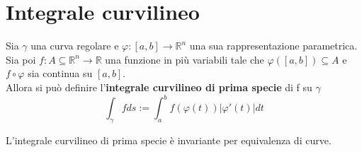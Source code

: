 \section{Integrale curvilineo}
\begin{definition}
    Sia $\gamma$ una curva regolare e $\varphi:[a,b]\to \mathbb{R}^n$ una sua rappresentazione parametrica. Sia poi $f:A\subseteq \mathbb{R}^n \to \mathbb{R}$ una funzione in più variabili tale che $\varphi([a,b])\subseteq A$ e $f \circ\varphi$ sia continua su $[a,b]$.\\
    Allora si può definire l'\textbf{integrale curvilineo di prima specie} di f su $\gamma$
    \begin{equation}
        \int_\gamma{fds} := \int_{a}^{b}{f(\varphi(t))|\varphi'(t)|dt}
    \end{equation}
\end{definition}
\begin{theorem}
    L'integrale curvilineo di prima specie è invariante per equivalenza di curve.
\end{theorem}
